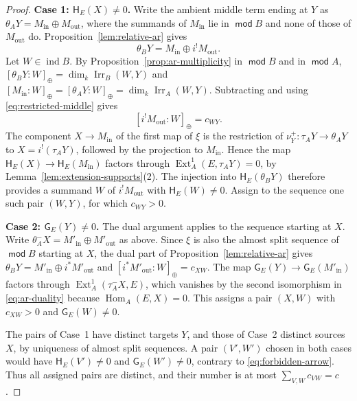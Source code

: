 \documentclass[a4paper,reqno,10pt]{amsart}
\theoremstyle{definition}
\numberwithin{equation}{section}
\DeclareMathOperator{\moduleCategory}{\mathsf{mod}}
\renewcommand{\mod}{\moduleCategory}
\DeclareMathOperator{\ind}{ind}
\DeclareMathOperator{\Hom}{Hom}
\DeclareMathOperator{\Ext}{Ext}
\DeclareMathOperator{\Irr}{Irr}
\begin{document}
\begin{proof}
\textbf{Case 1: \(\mathsf H_E(X)\ne0\).}
Write the ambient middle term ending at \(Y\) as
\(\theta_A Y=M_{\mathrm{in}}\oplus M_{\mathrm{out}}\), where the summands of
\(M_{\mathrm{in}}\) lie in \(\mod B\) and none of those of
\(M_{\mathrm{out}}\) do. Proposition~\ref{lem:relative-ar} gives
\begin{equation}\label{eq:restricted-middle}
 \theta_B Y=M_{\mathrm{in}}\oplus i^!M_{\mathrm{out}}.
\end{equation}
Let \(W\in\ind B\). By Proposition~\ref{prop:ar-multiplicity} in
\(\mod B\) and in \(\mod A\),
\([\theta_B Y:W]_\oplus=\dim_k\Irr_B(W,Y)\) and
\([M_{\mathrm{in}}:W]_\oplus=[\theta_A Y:W]_\oplus=\dim_k\Irr_A(W,Y)\).
Subtracting and using \eqref{eq:restricted-middle} gives
\begin{equation}\label{eq:restricted-multiplicity}
 [i^!M_{\mathrm{out}}:W]_\oplus=c_{WY}.
\end{equation}
The component \(X\to M_{\mathrm{in}}\) of the first map of \(\xi\) is the
restriction of \(\nu_Y^+:\tau_A Y\to\theta_A Y\) to \(X=i^!(\tau_A Y)\), followed by the
projection to \(M_{\mathrm{in}}\). Hence the map
\(\mathsf H_E(X)\to\mathsf H_E(M_{\mathrm{in}})\) factors through
\(\Ext_A^1(E,\tau_A Y)=0\), by Lemma~\ref{lem:extension-supports}(2).
The injection into \(\mathsf H_E(\theta_B Y)\) therefore provides a
summand \(W\) of \(i^!M_{\mathrm{out}}\) with \(\mathsf H_E(W)\ne0\).
Assign to the sequence one such pair \((W,Y)\), for which \(c_{WY}>0\).

\textbf{Case 2: \(\mathsf G_E(Y)\ne0\).}
The dual argument applies to the sequence starting at \(X\). Write \(\theta_A^-X=M'_{\mathrm{in}}\oplus M'_{\mathrm{out}}\) as
above. Since \(\xi\) is also the almost split sequence of \(\mod B\) starting at
\(X\), the dual part of Proposition~\ref{lem:relative-ar} gives
\(\theta_B Y=M'_{\mathrm{in}}\oplus i^*M'_{\mathrm{out}}\) and
\([i^*M'_{\mathrm{out}}:W]_\oplus=c_{XW}\). The map
\(\mathsf G_E(Y)\to\mathsf G_E(M'_{\mathrm{in}})\) factors through
\(\Ext_A^1(\tau_A^-X,E)\), which vanishes by the second isomorphism in
\eqref{eq:ar-duality} because \(\Hom_A(E,X)=0\). This assigns a pair
\((X,W)\) with \(c_{XW}>0\) and \(\mathsf G_E(W)\ne0\).

The pairs of Case~1 have distinct targets \(Y\), and those of Case~2
distinct sources \(X\), by uniqueness of almost split sequences. A pair
\((V',W')\) chosen in both cases would have
\(\mathsf H_E(V')\ne0\) and \(\mathsf G_E(W')\ne0\), contrary to
\eqref{eq:forbidden-arrow}.
Thus all assigned pairs are distinct, and their number is at most
\(\sum_{V,W}c_{VW}=c\).
\end{proof}
\end{document}
